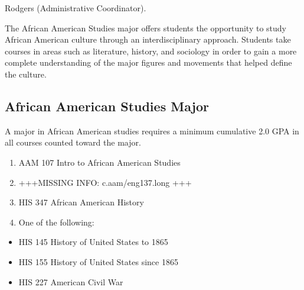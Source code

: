 \documentclass[
  letterpaper,
]{scrbook}
\providecommand{\tightlist}{%
  \setlength{\itemsep}{0pt}\setlength{\parskip}{0pt}}
\begin{document}
Rodgers (Administrative Coordinator).

The African American Studies major offers students the opportunity to
study African American culture through an interdisciplinary approach.
Students take courses in areas such as literature, history, and
sociology in order to gain a more complete understanding of the major
figures and movements that helped define the culture.

\subsection{African American Studies
Major}\label{african-american-studies-major}

A major in African American studies requires a minimum cumulative 2.0
GPA in all courses counted toward the major.

\begin{enumerate}
\def\labelenumi{\arabic{enumi}.}
\tightlist
\item
  AAM 107 Intro to African American Studies
\item
  +++MISSING INFO: c.aam/eng137.long +++
\item
  HIS 347 African American History
\item
  One of the following:
\end{enumerate}

\begin{itemize}
\tightlist
\item
  HIS 145 History of United States to 1865
\item
  HIS 155 History of United States since 1865
\item
  HIS 227 American Civil War
\end{itemize}
\end{document}
